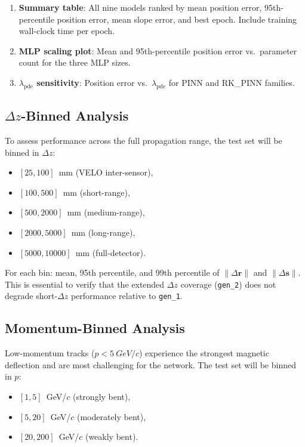 \documentclass[a4paper,11pt]{article}
\newcommand{\SI}[2]{#1~#2}
\newcommand{\giga}{G}
\newcommand{\eV}{eV}
\newcommand{\dz}{\Delta z}
\begin{document}
\begin{enumerate}
  \item \textbf{Summary table}: All nine models ranked by mean position
    error, 95th-percentile position error, mean slope error, and
    best epoch.  Include training wall-clock time per epoch.
  \item \textbf{MLP scaling plot}: Mean and 95th-percentile position
    error vs.\ parameter count for the three MLP sizes.
  \item \textbf{$\lambda_\text{pde}$ sensitivity}: Position error vs.\
    $\lambda_\text{pde}$ for PINN and RK\_PINN families.
\end{enumerate}

\subsection{$\dz$-Binned Analysis}

To assess performance across the full propagation range, the test set will
be binned in $\dz$:
\begin{itemize}
  \item $[25, 100]$~mm (VELO inter-sensor),
  \item $[100, 500]$~mm (short-range),
  \item $[500, 2000]$~mm (medium-range),
  \item $[2000, 5000]$~mm (long-range),
  \item $[5000, 10000]$~mm (full-detector).
\end{itemize}
For each bin: mean, 95th percentile, and 99th percentile of
$\|\Delta\mathbf{r}\|$ and $\|\Delta\mathbf{s}\|$.  This is essential to
verify that the extended $\dz$ coverage (\texttt{gen\_2}) does not degrade
short-$\dz$ performance relative to \texttt{gen\_1}.

\subsection{Momentum-Binned Analysis}

Low-momentum tracks ($p < \SI{5}{\giga\eV}/c$) experience the strongest
magnetic deflection and are most challenging for the network.  The test
set will be binned in $p$:
\begin{itemize}
  \item $[1, 5]$~GeV/$c$ (strongly bent),
  \item $[5, 20]$~GeV/$c$ (moderately bent),
  \item $[20, 200]$~GeV/$c$ (weakly bent).
\end{itemize}
\end{document}

